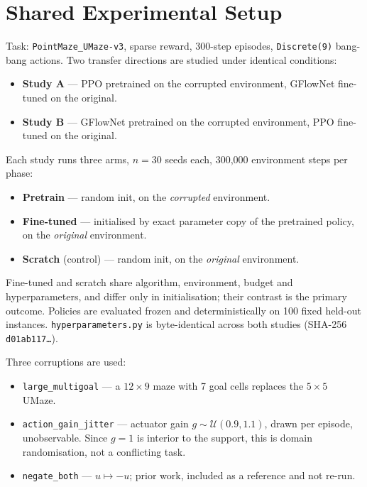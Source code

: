 
\section{Shared Experimental Setup}

Task: \texttt{PointMaze\_UMaze-v3}, sparse reward, 300-step episodes,
\texttt{Discrete(9)} bang-bang actions. Two transfer directions are studied
under identical conditions:

\begin{itemize}
  \item \textbf{Study A} --- PPO pretrained on the corrupted environment, GFlowNet fine-tuned on the original.
  \item \textbf{Study B} --- GFlowNet pretrained on the corrupted environment, PPO fine-tuned on the original.
\end{itemize}

Each study runs three arms, $n=30$ seeds each, 300,000 environment steps per
phase:

\begin{itemize}
  \item \textbf{Pretrain} --- random init, on the \emph{corrupted} environment.
  \item \textbf{Fine-tuned} --- initialised by exact parameter copy of the pretrained policy, on the \emph{original} environment.
  \item \textbf{Scratch} (control) --- random init, on the \emph{original} environment.
\end{itemize}

Fine-tuned and scratch share algorithm, environment, budget and
hyperparameters, and differ only in initialisation; their contrast is the
primary outcome. Policies are evaluated frozen and deterministically on 100
fixed held-out instances. \texttt{hyperparameters.py} is byte-identical across
both studies (SHA-256 \texttt{d01ab117\dots}).

Three corruptions are used:

\begin{itemize}
  \item \texttt{large\_multigoal} --- a $12\times9$ maze with 7 goal cells replaces the $5\times5$ UMaze.
  \item \texttt{action\_gain\_jitter} --- actuator gain $g\sim\mathcal{U}(0.9,1.1)$, drawn per episode, unobservable. Since $g=1$ is interior to the support, this is domain randomisation, not a conflicting task.
  \item \texttt{negate\_both} --- $u\mapsto-u$; prior work, included as a reference and not re-run.
\end{itemize}

